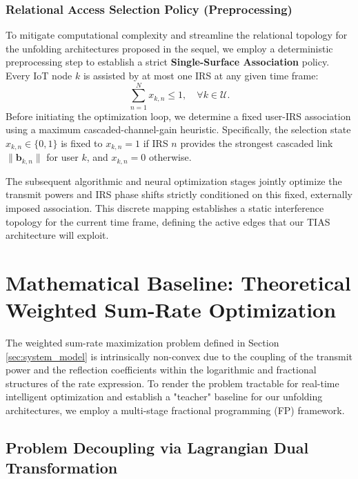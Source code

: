 \documentclass[journal]{IEEEtran}
\begin{document}
\subsubsection{Relational Access Selection Policy (Preprocessing)}
To mitigate computational complexity and streamline the relational topology for the unfolding architectures proposed in the sequel, we employ a deterministic preprocessing step to establish a strict \textbf{Single-Surface Association} policy. Every IoT node $k$ is assisted by at most one IRS at any given time frame:
\begin{equation}
    \sum_{n=1}^{N} x_{k,n} \le 1, \quad \forall k \in \mathcal{U}.
\end{equation}
Before initiating the optimization loop, we determine a fixed user-IRS association using a maximum cascaded-channel-gain heuristic. Specifically, the selection state $x_{k,n} \in \{0, 1\}$ is fixed to $x_{k,n} = 1$ if IRS $n$ provides the strongest cascaded link $\|\mathbf{b}_{k,n}\|$ for user $k$, and $x_{k,n} = 0$ otherwise. 

The subsequent algorithmic and neural optimization stages jointly optimize the transmit powers and IRS phase shifts strictly conditioned on this fixed, externally imposed association. This discrete mapping establishes a static interference topology for the current time frame, defining the active edges that our TIAS architecture will exploit.

\section{Mathematical Baseline: Theoretical Weighted Sum-Rate Optimization}
\label{sec:math_baseline}

The weighted sum-rate maximization problem defined in Section \ref{sec:system_model} is intrinsically non-convex due to the coupling of the transmit power and the reflection coefficients within the logarithmic and fractional structures of the rate expression. To render the problem tractable for real-time intelligent optimization and establish a "teacher" baseline for our unfolding architectures, we employ a multi-stage fractional programming (FP) framework.

\subsection{Problem Decoupling via Lagrangian Dual Transformation}
\label{subsec:decoupling}
\end{document}
